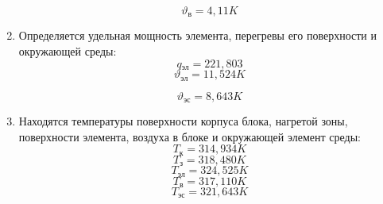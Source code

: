\begin{enumerate}[label={\arabic*.}]
  $$\vartheta\mathrm{_в} = 4,11K$$

\item Определяется удельная мощность элемента, перегревы его
    поверхности и окружающей среды:
    $$q\mathrm{_{эл}} =221,803$$
    $$\vartheta\mathrm{_{эл}} = 11,524 K$$

    $$\vartheta\mathrm{_{эс}} = 8,643 K$$

  \item Находятся температуры поверхности корпуса блока, нагретой
зоны, поверхности элемента, воздуха в блоке и окружающей элемент
среды:
$$T\mathrm{_{к}} = 314,934 K$$
$$T\mathrm{_з} = 318,480 K$$
$$T\mathrm{_{эл}} = 324,525 K$$
$$T\mathrm{_{в}} = 317,110 K$$
$$T\mathrm{_{эс}} =321,643 K$$

\end{enumerate}